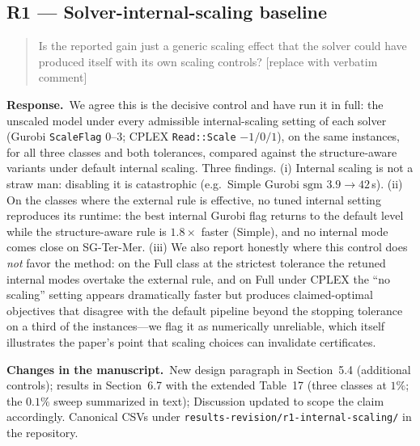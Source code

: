 \documentclass[11pt]{article}
\newenvironment{reviewerquote}%
  {\medskip\noindent\color{quotegray}\itshape\begin{quotation}\noindent}%
  {\end{quotation}\medskip}
\newcommand{\resp}{\noindent\textbf{Response.}\ }
\newcommand{\changes}{\par\smallskip\noindent\textbf{Changes in the manuscript.}\ }
\newcommand{\secref}[1]{Section~#1}
\begin{document}
\subsection*{R1 --- Solver-internal-scaling baseline}
\begin{reviewerquote}
Is the reported gain just a generic scaling effect that the solver could have produced
itself with its own scaling controls? [replace with verbatim comment]
\end{reviewerquote}
\resp We agree this is the decisive control and have run it in full: the unscaled model
under every admissible internal-scaling setting of each solver (Gurobi
\texttt{ScaleFlag} $0$--$3$; CPLEX \texttt{Read::Scale} $-1/0/1$), on the same instances,
for all three classes and both tolerances, compared against the structure-aware variants
under default internal scaling. Three findings. (i) Internal scaling is not a straw man:
disabling it is catastrophic (e.g.\ Simple Gurobi $\mathrm{sgm}$ $3.9\to42$\,s). (ii) On
the classes where the external rule is effective, no tuned internal setting reproduces
its runtime: the best internal Gurobi flag returns to the default level while the
structure-aware rule is $1.8\times$ faster (Simple), and no internal mode comes close on
SG-Ter-Mer. (iii) We also report honestly where this control does \emph{not} favor the
method: on the Full class at the strictest tolerance the retuned internal modes overtake
the external rule, and on Full under CPLEX the ``no scaling'' setting appears
dramatically faster but produces claimed-optimal objectives that disagree with the
default pipeline beyond the stopping tolerance on a third of the instances---we flag it
as numerically unreliable, which itself illustrates the paper's point that scaling
choices can invalidate certificates.
\changes New design paragraph in \secref{5.4} (additional controls); results in
\secref{6.7} with the extended Table~17 (three classes at $1\%$; the $0.1\%$ sweep
summarized in text); Discussion updated to scope the claim accordingly. Canonical CSVs
under \texttt{results-revision/r1-internal-scaling/} in the repository.
\end{document}
